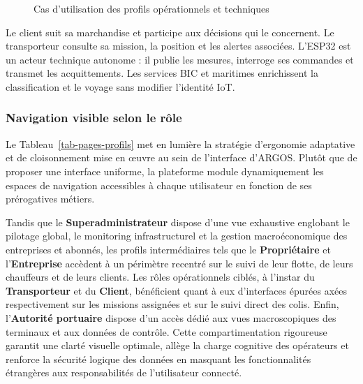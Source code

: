 \begin{figure}[htbp]
\centering
\resizebox{0.95\textwidth}{!}{%
}
\caption{Cas d'utilisation des profils opérationnels et techniques}
\label{fig-argos-usecase-operations}
\tablesourcepromoteurs

\end{figure}

Le client suit sa marchandise et participe aux décisions qui le concernent.
Le transporteur consulte sa mission, la position et les alertes associées.
L'ESP32 est un acteur technique autonome : il publie les mesures, interroge
ses commandes et transmet les acquittements. Les services BIC et maritimes
enrichissent la classification et le voyage sans modifier l'identité IoT.

\subsubsection{Navigation visible selon le rôle}

Le Tableau~\ref{tab-pages-profils} met en lumière la stratégie d'ergonomie adaptative et de cloisonnement mise en œuvre au sein de l'interface d'ARGOS. Plutôt que de proposer une interface uniforme, la plateforme module dynamiquement les espaces de navigation accessibles à chaque utilisateur en fonction de ses prérogatives métiers. 

Tandis que le \textbf{Superadministrateur} dispose d'une vue exhaustive englobant le pilotage global, le monitoring infrastructurel et la gestion macroéconomique des entreprises et abonnés, les profils intermédiaires tels que le \textbf{Propriétaire} et l'\textbf{Entreprise} accèdent à un périmètre recentré sur le suivi de leur flotte, de leurs chauffeurs et de leurs clients. Les rôles opérationnels ciblés, à l'instar du \textbf{Transporteur} et du \textbf{Client}, bénéficient quant à eux d'interfaces épurées axées respectivement sur les missions assignées et sur le suivi direct des colis. Enfin, l'\textbf{Autorité portuaire} dispose d'un accès dédié aux vues macroscopiques des terminaux et aux données de contrôle. Cette compartimentation rigoureuse garantit une clarté visuelle optimale, allège la charge cognitive des opérateurs et renforce la sécurité logique des données en masquant les fonctionnalités étrangères aux responsabilités de l'utilisateur connecté.

